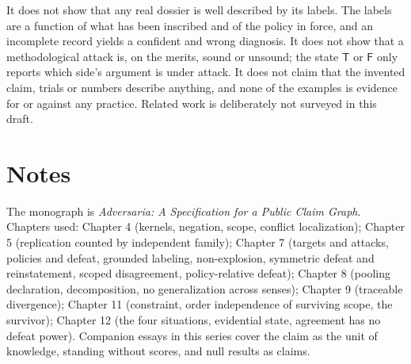 \documentclass[11pt]{article}
\begin{document}
It does not show that any real dossier is well described by its labels. The labels are a function of what has been inscribed and of the policy in force, and an incomplete record yields a confident and wrong diagnosis. It does not show that a methodological attack is, on the merits, sound or unsound; the state $\mathsf T$ or $\mathsf F$ only reports which side's argument is under attack. It does not claim that the invented claim, trials or numbers describe anything, and none of the examples is evidence for or against any practice. Related work is deliberately not surveyed in this draft.


\section*{Notes}

The monograph is \emph{Adversaria: A Specification for a Public Claim Graph}. Chapters used: Chapter 4 (kernels, negation, scope, conflict localization); Chapter 5 (replication counted by independent family); Chapter 7 (targets and attacks, policies and defeat, grounded labeling, non-explosion, symmetric defeat and reinstatement, scoped disagreement, policy-relative defeat); Chapter 8 (pooling declaration, decomposition, no generalization across senses); Chapter 9 (traceable divergence); Chapter 11 (constraint, order independence of surviving scope, the survivor); Chapter 12 (the four situations, evidential state, agreement has no defeat power). Companion essays in this series cover the claim as the unit of knowledge, standing without scores, and null results as claims.
\end{document}
